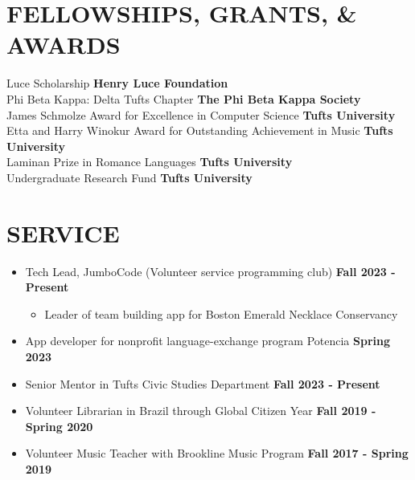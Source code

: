 \documentclass[12pt]{article}
\begin{document}
\vspace{-\baselineskip}




\section*{FELLOWSHIPS, GRANTS, \& AWARDS}
Luce Scholarship                                                      \hfill \textbf{Henry Luce Foundation} \\
Phi Beta Kappa: Delta Tufts Chapter                                   \hfill \textbf{The Phi Beta Kappa Society} \\
James Schmolze Award for Excellence in Computer Science               \hfill \textbf{Tufts University} \\ 
Etta and Harry Winokur Award for Outstanding Achievement in Music     \hfill \textbf{Tufts University} \\
Laminan Prize in Romance Languages                                    \hfill \textbf{Tufts University} \\
Undergraduate Research Fund \hfill                                    \textbf{Tufts University} \\


\section*{SERVICE}
\vspace{-0.5\baselineskip}
\begin{itemize}
    \itemsep=-0.3em
    \item Tech Lead, JumboCode (Volunteer service programming club) \hfill \textbf{Fall 2023 - Present}
    \begin{itemize}
        \item Leader of team building app for Boston Emerald Necklace Conservancy 
    \end{itemize}
    \item App developer for nonprofit language-exchange program Potencia \hfill \textbf{Spring 2023}
    \item Senior Mentor in Tufts Civic Studies Department  \hfill \textbf{Fall 2023 - Present}
    \item Volunteer Librarian in Brazil through Global Citizen Year \hfill \textbf{Fall 2019 - Spring 2020}
    \item Volunteer Music Teacher with Brookline Music Program \hfill \textbf{Fall 2017 - Spring 2019}
\end{itemize}
\end{document}
